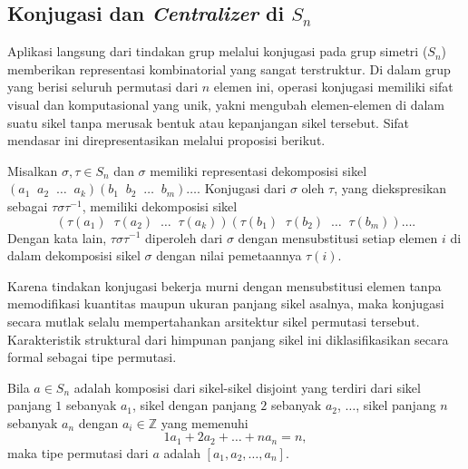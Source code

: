 \subsection{Konjugasi dan \emph{Centralizer} di $S_n$}

Aplikasi langsung dari tindakan grup melalui konjugasi pada grup simetri ($S_n$) memberikan representasi kombinatorial yang sangat terstruktur. Di dalam grup yang berisi seluruh permutasi dari $n$ elemen ini, operasi konjugasi memiliki sifat visual dan komputasional yang unik, yakni mengubah elemen-elemen di dalam suatu sikel tanpa merusak bentuk atau kepanjangan sikel tersebut. Sifat mendasar ini direpresentasikan melalui proposisi berikut.

\begin{proposisi}\label{prop:konjugasi_sikel_Sn}
  Misalkan $\sigma, \tau \in S_n$ dan $\sigma$ memiliki representasi dekomposisi sikel $(a_1\;\; a_2\;\; \ldots\;\; a_k)(b_1\;\; b_2\;\; \ldots\;\; b_m)\ldots$. Konjugasi dari $\sigma$ oleh $\tau$, yang diekspresikan sebagai $\tau \sigma \tau^{-1}$, memiliki dekomposisi sikel
  \[
    (\tau(a_1)\;\; \tau(a_2)\;\; \ldots\;\; \tau(a_k))(\tau(b_1)\;\; \tau(b_2)\;\; \ldots\;\; \tau(b_m))\ldots.
  \]
  Dengan kata lain, $\tau \sigma \tau^{-1}$ diperoleh dari $\sigma$ dengan mensubstitusi setiap elemen $i$ di dalam dekomposisi sikel $\sigma$ dengan nilai pemetaannya $\tau(i)$.
\end{proposisi}

Karena tindakan konjugasi bekerja murni dengan mensubstitusi elemen tanpa memodifikasi kuantitas maupun ukuran panjang sikel asalnya, maka konjugasi secara mutlak selalu mempertahankan arsitektur sikel permutasi tersebut. Karakteristik struktural dari himpunan panjang sikel ini diklasifikasikan secara formal sebagai tipe permutasi.

\begin{definisi}\label{def:tipe_permutasi}
  Bila $a \in S_n$ adalah komposisi dari sikel-sikel disjoint yang terdiri dari sikel panjang $1$ sebanyak $a_1$, sikel dengan panjang $2$ sebanyak $a_2$, $\ldots$, sikel panjang $n$ sebanyak $a_n$ dengan $a_i \in \mathbb{Z}$ yang memenuhi
  \[
    1a_1 + 2a_2 + \ldots + na_n = n,
  \]
  maka tipe permutasi dari $a$ adalah $[a_1, a_2, \ldots, a_n]$.
\end{definisi}


